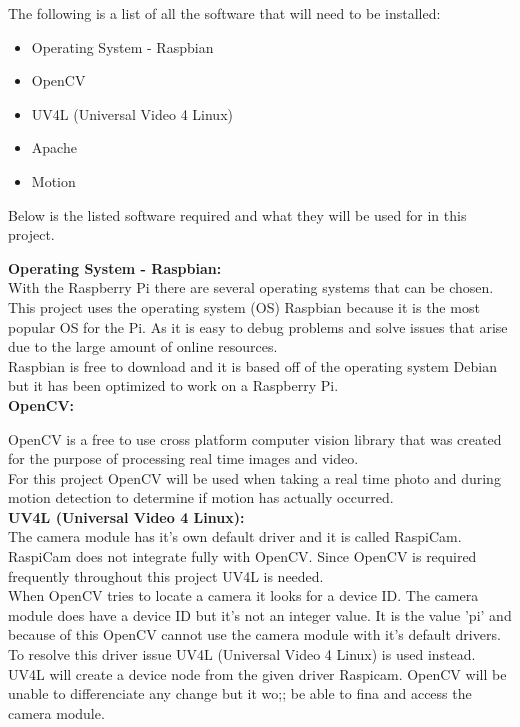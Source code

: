 \documentclass[12pt]{report}
\begin{document}
The following is a list of all the software that will need to be installed:\\
\begin{itemize}
  \item Operating System - Raspbian \\
  \item OpenCV\\
  \item UV4L (Universal Video 4 Linux)\\  
  \item Apache\\
  \item Motion\\
\end{itemize}

Below is the listed software required and what they will be used for in this project.

\noindent
{\bf Operating System - Raspbian:}\\
\break
With the Raspberry Pi there are several operating systems that can be chosen. This project uses the operating system (OS) Raspbian because it is the most popular OS for the Pi. As it is easy to debug problems and solve issues that arise due to the large amount of online resources.\\

Raspbian is free to download and it is based off of the operating system Debian but it has been optimized to work on a Raspberry Pi. \\ 

\noindent
{\bf OpenCV:}\\
\break

OpenCV is a free to use cross platform computer vision library that was created for the purpose of processing real time images and video.\\

For this project OpenCV will be used when taking a real time photo and during motion detection to determine if motion has actually occurred.\\

\noindent
{\bf UV4L (Universal Video 4 Linux):}\\
\break
The camera module has it's own default driver and it is called RaspiCam. RaspiCam does not integrate fully with OpenCV. Since OpenCV is required frequently throughout this project UV4L is needed.\\

When OpenCV tries to locate a camera it looks for a device ID. The camera module does have a device ID but it's not an integer value. It is the value 'pi' and because of this OpenCV cannot use the camera module with it's default drivers. To resolve this driver issue UV4L (Universal Video 4 Linux) is used instead. UV4L will create a device node from the given driver Raspicam. OpenCV will be unable to differenciate any change but it wo;; be able to fina and access the camera module.\\
\end{document}

